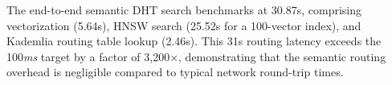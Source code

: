 The end-to-end semantic DHT search benchmarks at 30.87\textmu s, comprising vectorization (5.64\textmu s), HNSW search (25.52\textmu s for a 100-vector index), and Kademlia routing table lookup (2.46\textmu s). This 31\textmu s routing latency exceeds the 100\textit{ms} target by a factor of 3,200$\times$, demonstrating that the semantic routing overhead is negligible compared to typical network round-trip times.
